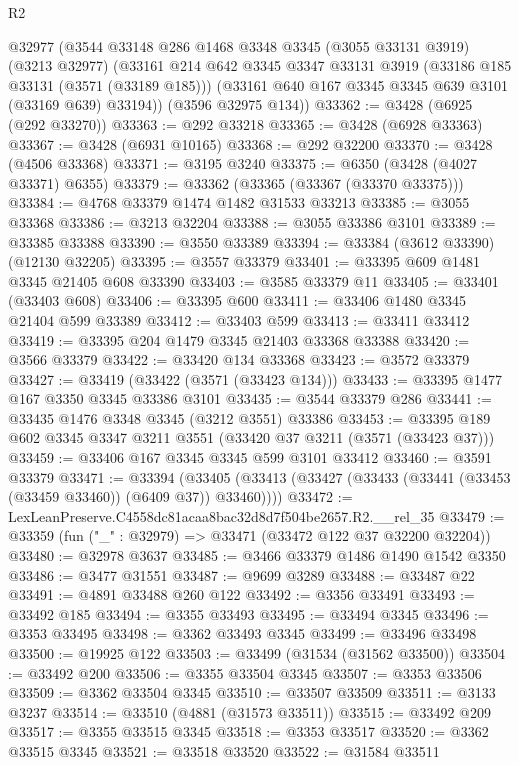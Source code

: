 \begin{lexlean}{R2}
\begin{coremodule}
    @32977
    (@3544
      @33148
      @286
      @1468
      @3348
      @3345
      (@3055 @33131 @3919)
      (@3213 @32977)
      (@33161
        @214
        @642
        @3345
        @3347
        @33131
        @3919
        (@33186 @185 @33131 (@3571 (@33189 @185)))
        (@33161 @640 @167 @3345 @3345 @639 @3101 (@33169 @639) @33194))
      (@3596 @32975 @134))
@33362 := @3428 (@6925 (@292 @33270))
@33363 := @292 @33218
@33365 := @3428 (@6928 @33363)
@33367 := @3428 (@6931 @10165)
@33368 := @292 @32200
@33370 := @3428 (@4506 @33368)
@33371 := @3195 @3240
@33375 := @6350 (@3428 (@4027 @33371) @6355)
@33379 := @33362 (@33365 (@33367 (@33370 @33375)))
@33384 := @4768 @33379 @1474 @1482 @31533 @33213
@33385 := @3055 @33368
@33386 := @3213 @32204
@33388 := @3055 @33386 @3101
@33389 := @33385 @33388
@33390 := @3550 @33389
@33394 := @33384 (@3612 @33390) (@12130 @32205)
@33395 := @3557 @33379
@33401 := @33395 @609 @1481 @3345 @21405 @608 @33390
@33403 := @3585 @33379 @11
@33405 := @33401 (@33403 @608)
@33406 := @33395 @600
@33411 := @33406 @1480 @3345 @21404 @599 @33389
@33412 := @33403 @599
@33413 := @33411 @33412
@33419 := @33395 @204 @1479 @3345 @21403 @33368 @33388
@33420 := @3566 @33379
@33422 := @33420 @134 @33368
@33423 := @3572 @33379
@33427 := @33419 (@33422 (@3571 (@33423 @134)))
@33433 := @33395 @1477 @167 @3350 @3345 @33386 @3101
@33435 := @3544 @33379 @286
@33441 := @33435 @1476 @3348 @3345 (@3212 @3551) @33386
@33453 := @33395 @189 @602 @3345 @3347 @3211 @3551 (@33420 @37 @3211 (@3571 (@33423 @37)))
@33459 := @33406 @167 @3345 @3345 @599 @3101 @33412
@33460 := @3591 @33379
@33471 := @33394
    (@33405 (@33413 (@33427 (@33433 (@33441 (@33453 (@33459 @33460)) (@6409 @37)) @33460))))
@33472 := LexLeanPreserve.C4558dc81acaa8bac32d8d7f504be2657.R2.__rel_35
@33479 := @33359 (fun ("_" : @32979) => @33471 (@33472 @122 @37 @32200 @32204))
@33480 := @32978 @3637
@33485 := @3466 @33379 @1486 @1490 @1542 @3350
@33486 := @3477 @31551
@33487 := @9699 @3289
@33488 := @33487 @22
@33491 := @4891 @33488 @260 @122
@33492 := @3356 @33491
@33493 := @33492 @185
@33494 := @3355 @33493
@33495 := @33494 @3345
@33496 := @3353 @33495
@33498 := @3362 @33493 @3345
@33499 := @33496 @33498
@33500 := @19925 @122
@33503 := @33499 (@31534 (@31562 @33500))
@33504 := @33492 @200
@33506 := @3355 @33504 @3345
@33507 := @3353 @33506
@33509 := @3362 @33504 @3345
@33510 := @33507 @33509
@33511 := @3133 @3237
@33514 := @33510 (@4881 (@31573 @33511))
@33515 := @33492 @209
@33517 := @3355 @33515 @3345
@33518 := @3353 @33517
@33520 := @3362 @33515 @3345
@33521 := @33518 @33520
@33522 := @31584 @33511

\end{coremodule}
\end{lexlean}
